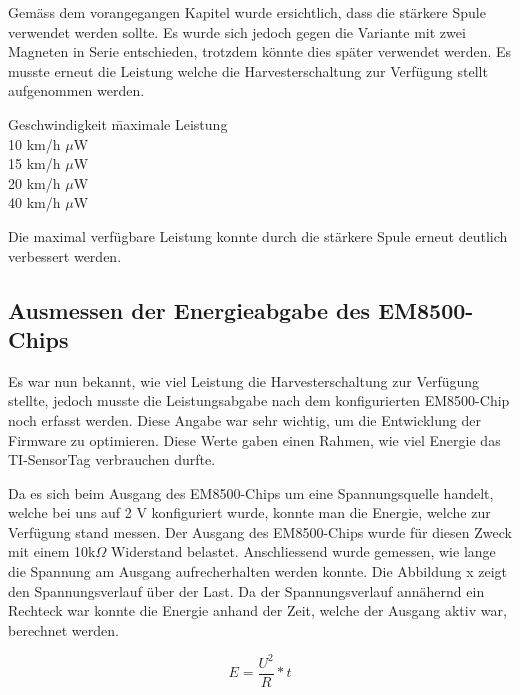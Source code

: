 Gemäss dem vorangegangen Kapitel  wurde ersichtlich, dass die stärkere Spule verwendet werden sollte. Es wurde sich jedoch gegen die Variante mit zwei Magneten in Serie entschieden, trotzdem könnte dies später verwendet werden. Es musste erneut die Leistung welche die Harvesterschaltung zur Verfügung stellt aufgenommen werden.

\begin{tabbing}
    Geschwindigkeit   	\quad\= maximale Leistung    \\[0.8ex]
    10 km/h		         $\mu$W\\
	15 km/h		         $\mu$W\\
	20 km/h		         $\mu$W\\
	40 km/h		         $\mu$W\\
\end{tabbing}

Die maximal verfügbare Leistung konnte durch die stärkere Spule erneut deutlich verbessert werden. 

\subsection{Ausmessen der Energieabgabe des EM8500-Chips}

Es war nun bekannt, wie viel Leistung die Harvesterschaltung zur Verfügung stellte, jedoch musste die Leistungsabgabe nach dem konfigurierten EM8500-Chip noch erfasst werden. Diese Angabe war sehr wichtig, um die Entwicklung der Firmware zu optimieren. Diese Werte gaben einen Rahmen, wie viel Energie das TI-SensorTag verbrauchen durfte.

Da es sich beim Ausgang des EM8500-Chips um eine Spannungsquelle handelt, welche bei uns auf 2 V konfiguriert wurde, konnte man die Energie, welche zur Verfügung stand messen. Der Ausgang des EM8500-Chips wurde für diesen Zweck mit einem 10k$\Omega$ Widerstand belastet. Anschliessend wurde gemessen, wie lange die Spannung am Ausgang aufrecherhalten werden konnte. Die Abbildung x zeigt den Spannungsverlauf über der Last. Da der Spannungsverlauf annähernd ein Rechteck war konnte die Energie anhand der Zeit, welche der Ausgang aktiv war, berechnet werden.

\begin{equation}
	E = \frac{U^2}{R}  *t %
\end{equation}

